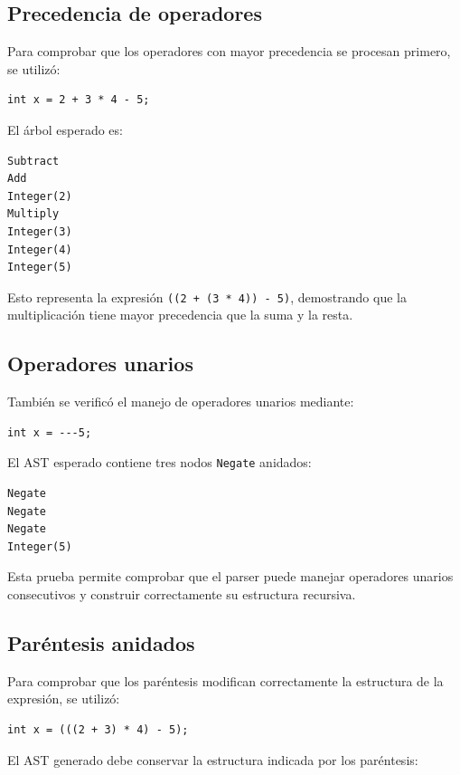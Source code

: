 \documentclass[12pt,letterpaper]{article}
\begin{document}
\subsection*{Precedencia de operadores}

Para comprobar que los operadores con mayor precedencia se procesan primero, se utilizó:

\begin{verbatim}
int x = 2 + 3 * 4 - 5;
\end{verbatim}

El árbol esperado es:

\begin{verbatim}
Subtract
Add
Integer(2)
Multiply
Integer(3)
Integer(4)
Integer(5)
\end{verbatim}

Esto representa la expresión \texttt{((2 + (3 * 4)) - 5)}, demostrando que la multiplicación tiene mayor precedencia que la suma y la resta.

\subsection*{Operadores unarios}

También se verificó el manejo de operadores unarios mediante:

\begin{verbatim}
int x = ---5;
\end{verbatim}

El AST esperado contiene tres nodos \texttt{Negate} anidados:

\begin{verbatim}
Negate
Negate
Negate
Integer(5)
\end{verbatim}

Esta prueba permite comprobar que el parser puede manejar operadores unarios consecutivos y construir correctamente su estructura recursiva.

\subsection*{Paréntesis anidados}

Para comprobar que los paréntesis modifican correctamente la estructura de la expresión, se utilizó:

\begin{verbatim}
int x = (((2 + 3) * 4) - 5);
\end{verbatim}

El AST generado debe conservar la estructura indicada por los paréntesis:
\end{document}
